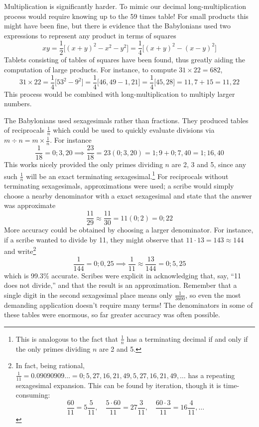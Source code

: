 Multiplication is significantly harder. To mimic our decimal long-multiplication process would require knowing up to the 59 times table! For small products this might have been fine, but there is evidence that the Babylonians used two expressions to represent any product in terms of squares
\[xy=\frac 12\bigl[(x+y)^2-x^2-y^2\bigr]=\frac 14\bigl[(x+y)^2-(x-y)^2\bigr]\]
Tablets consisting of tables of squares have been found, thus greatly aiding the computation of large products. For instance, to compute $31\times 22=682$,
\[31\times 22=\frac 14\bigl[53^2-9^2\bigr] =\frac 14\bigl[46,49-1,21\bigr] =\frac 14\bigl[45,28\bigr] =11,7+15=11,22\]
This process would be combined with long-multiplication to multiply larger numbers.


\label{babfraction}

The Babylonians used sexagesimals rather than fractions. They produced tables of reciprocals $\frac 1n$ which could be used to quickly evaluate divisions via $m\div n=m\times \frac 1n$. For instance
\[\frac 1{18}=0;3,20 \implies \frac{23}{18}=23(0;3,20) =1;9+0;7,40 =1;16,40\]
This works nicely provided the only primes dividing $n$ are 2, 3 and 5, since any such $\frac 1n$ will be an exact terminating sexagesimal.\footnote{This is analogous to the fact that $\frac 1n$ has a terminating decimal if and only if the only primes dividing $n$ are 2 and 5.}\smallbreak
For reciprocals without terminating sexagesimals, approximations were used; a scribe would simply choose a nearby denominator with a exact sexagesimal and state that the answer was approximate
\[\frac{11}{29}\approx\frac{11}{30}=11(0;2)=0;22\]
More accuracy could be obtained by choosing a larger denominator. For instance, if a scribe wanted to divide by 11, they might observe that $11\cdot 13=143\approx 144$ and write\footnote{In fact, being rational, $\frac 1{11}=0.09090909\ldots=0;5,27,16,21,49,5,27,16,21,49,\ldots$ has a repeating sexagesimal expansion. This can be found by iteration, though it is time-consuming:
\[\frac{60}{11}=5\frac 5{11},\quad \frac{5\cdot 60}{11}=27\frac 3{11},\quad \frac{60\cdot 3}{11}=16\frac{4}{11},\ldots\]}
\[\frac 1{144}=0;0,25\implies \frac 1{11}\approx\frac{13}{144}=0;5,25\]
which is 99.3\%{} accurate. Scribes were explicit in acknowledging that, say, ``11 does not divide,'' and that the result is an approximation. Remember that a single digit in the second sexagesimal place means only $\frac 1{3600}$, so even the most demanding application doesn't require many terms! The denominators in some of these tables were enormous, so far greater accuracy was often possible.\medbreak


